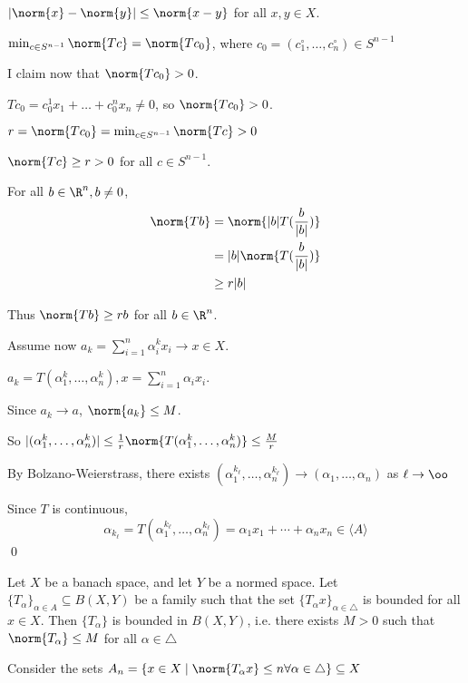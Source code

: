 \documentclass[x11names,reqno,14pt]{extarticle}
\begin{document}
$|\norm{x} - \norm{y}| \leq \norm{x - y}$ for all $x,  y \in X$. 

$\min_{c\in S^{n - 1}}\norm{Tc} = \norm{Tc_0}$, where $c_0 = (c_1^\circ, \dots, c_n^\circ) \in S^{n - 1}$

I claim now that $\norm{Tc_0} > 0$. 

$Tc_0 = c_0^1x_1 + \dots + c_0^nx_n \neq 0$, so $\norm{Tc_0} > 0$. 

$r = \norm{Tc_0} = \min_{c\in S^{n - 1}}\norm{Tc}>0$

$\norm{Tc} \geq r > 0$ for all $c \in S^{n - 1}$. 

For all $b \in\R^n, b\neq0$, 
\begin{align*}
\norm{Tb} & = \norm{|b|T(\frac{b}{|b|})} \\
& = |b|\norm{T(\frac{b}{|b|})} \\
& \geq r|b|
\end{align*}

Thus $\norm{Tb} \geq rb$ for all $b \in \R^n$. 

Assume now $a_k = \sum_{i=1}^n\alpha_i^kx_i\to x \in X$. 

$a_k = T(\alpha_1^k,\dots,\alpha_n^k), x = \sum_{i=1}^n\alpha_ix_i$.

Since $a_k\to a$, $\norm{a_k} \leq M$. 

So $|(\alpha_1^k,\dots,\alpha_n^k)| \leq \frac{1}{r}\norm{T(\alpha_1^k,\dots,\alpha_n^k)} \leq \frac{M}{r}$

By Bolzano-Weierstrass, there exists $(\alpha_1^{k_\ell}, \dots, \alpha_n^{k_\ell}) \to (\alpha_1,\dots,\alpha_n)$ as $\ell\to\oo$

Since $T$ is continuous, 
\[
\alpha_{k_\ell} = T(\alpha_1^{k_\ell},\dots,\alpha_n^{k_\ell}) = \alpha_1x_1 + \cdots + \alpha_nx_n \in \langle A \rangle
\]
\qed


Let $X$ be a banach space, and let $Y$ be a normed space. Let $\{T_\alpha\}_{\alpha\in A} \subseteq B(X, Y)$ be a family such that the set $\{T_\alpha x\}_{\alpha\in \bigtriangleup}$ is bounded for all $x \in X$. Then $\{T_\alpha\}$ is bounded in $B(X, Y)$, i.e. there exists $M > 0$ such that $\norm{T_\alpha} \leq M$ for all $\alpha\in \bigtriangleup$

\proof

Consider the sets $A_n = \{x\in X \mid \norm{T_\alpha x} \leq n \forall \alpha\in \bigtriangleup\}\subseteq X$
\end{document}
